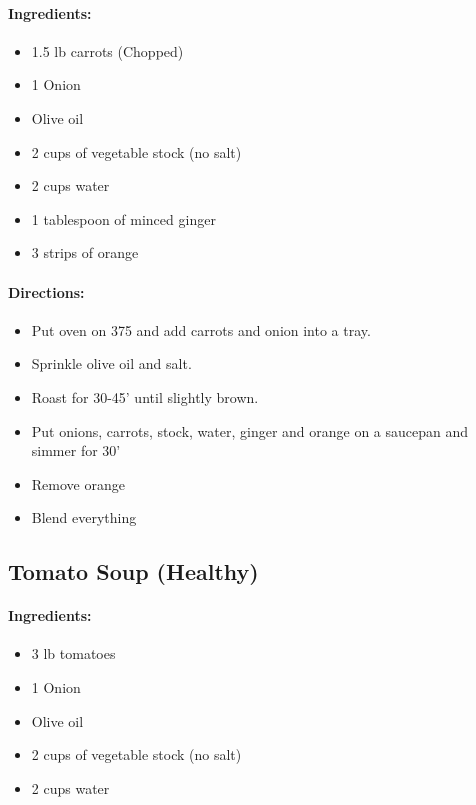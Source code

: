 \documentclass{article}
\begin{document}
\paragraph{Ingredients:}
\begin{itemize}
    \item 1.5 lb carrots (Chopped)
    \item 1 Onion
    \item Olive oil
    \item 2 cups of vegetable stock (no salt)
    \item 2 cups water
    \item 1 tablespoon of minced ginger
    \item 3 strips of orange
\end{itemize}

\paragraph{Directions:}
\begin{itemize}
    \item Put oven on 375 and add carrots and onion into a tray.
    \item Sprinkle olive oil and salt.
    \item Roast for 30-45' until slightly brown.
    \item Put onions, carrots, stock, water, ginger and orange on a saucepan and simmer for 30'
    \item Remove orange
    \item Blend everything
\end{itemize}

\subsection{Tomato Soup (Healthy)}

\paragraph{Ingredients:}
\begin{itemize}
    \item 3 lb tomatoes
    \item 1 Onion
    \item Olive oil
    \item 2 cups of vegetable stock (no salt)
    \item 2 cups water
\end{itemize}
\end{document}
